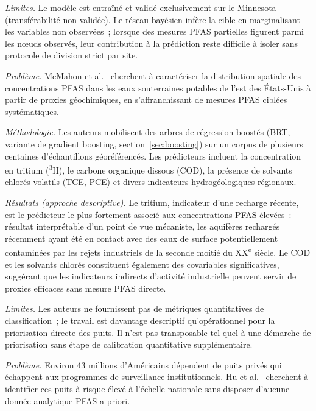\emph{Limites.}
Le mod\`ele est entra\^in\'e et valid\'e exclusivement sur le Minnesota (transf\'erabilit\'e non valid\'ee).
Le r\'eseau bay\'esien inf\`ere la cible en marginalisant les variables non observ\'ees~; lorsque des mesures PFAS partielles figurent parmi les n\oe uds observ\'es, leur contribution \`a la pr\'ediction reste difficile \`a isoler sans protocole de division strict par site.


\label{sec:art-mcmahon2022}

\emph{Probl\`eme.}
McMahon et al.~\cite{mcmahon2022pfas} cherchent \`a caract\'eriser la distribution spatiale des concentrations PFAS dans les eaux souterraines potables de l'est des \'Etats-Unis \`a partir de proxies g\'eochimiques, en s'affranchissant de mesures PFAS cibl\'ees syst\'ematiques.

\emph{M\'ethodologie.}
Les auteurs mobilisent des arbres de r\'egression boost\'es (BRT, variante de gradient boosting, section~\ref{sec:boosting}) sur un corpus de plusieurs centaines d'\'echantillons g\'eor\'ef\'erenc\'es.
Les pr\'edicteurs incluent la concentration en tritium (\textsuperscript{3}H), le carbone organique dissous (COD), la pr\'esence de solvants chlor\'es volatils (TCE, PCE) et divers indicateurs hydrog\'eologiques r\'egionaux.

\emph{R\'esultats (approche descriptive).}
Le tritium, indicateur d'une recharge r\'ecente, est le pr\'edicteur le plus fortement associ\'e aux concentrations PFAS \'elev\'ees~: r\'esultat interpr\'etable d'un point de vue m\'ecaniste, les aquif\`eres recharg\'es r\'ecemment ayant \'et\'e en contact avec des eaux de surface potentiellement contamin\'ees par les rejets industriels de la seconde moiti\'e du XX\textsuperscript{e} si\`ecle.
Le COD et les solvants chlor\'es constituent \'egalement des covariables significatives, sugg\'erant que les indicateurs indirects d'activit\'e industrielle peuvent servir de proxies efficaces sans mesure PFAS directe.

\emph{Limites.}
Les auteurs ne fournissent pas de m\'etriques quantitatives de classification~; le travail est davantage descriptif qu'op\'erationnel pour la priorisation directe des puits.
Il n'est pas transposable tel quel \`a une d\'emarche de priorisation sans \'etape de calibration quantitative suppl\'ementaire.


\label{sec:art-hu2021}

\emph{Probl\`eme.}
Environ 43 millions d'Am\'ericains d\'ependent de puits priv\'es qui \'echappent aux programmes de surveillance institutionnels.
Hu et al.~\cite{hu2021privatewells} cherchent \`a identifier ces puits \`a risque \'elev\'e \`a l'\'echelle nationale sans disposer d'aucune donn\'ee analytique PFAS a priori.

